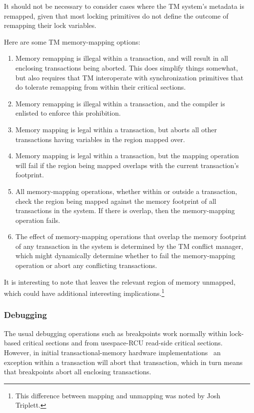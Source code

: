 It should not be necessary to consider cases where the TM system's
metadata is remapped, given that most locking primitives do not define
the outcome of remapping their lock variables.

Here are some TM memory-mapping options:

\begin{enumerate}
\item	Memory remapping is illegal within a transaction, and will result
	in all enclosing transactions being aborted.
	This does simplify things somewhat, but also requires that TM
	interoperate with synchronization primitives that do tolerate
	remapping from within their critical sections.
\item	Memory remapping is illegal within a transaction, and the
	compiler is enlisted to enforce this prohibition.
\item	Memory mapping is legal within a transaction, but aborts all
	other transactions having variables in the region mapped over.
\item	Memory mapping is legal within a transaction, but the mapping
	operation will fail if the region being mapped overlaps with
	the current transaction's footprint.
\item	All memory-mapping operations, whether within or outside a
	transaction, check the region being mapped against the memory
	footprint of all transactions in the system.
	If there is overlap, then the memory-mapping operation fails.
\item	The effect of memory-mapping operations that overlap the memory
	footprint of any transaction in the system is determined by the
	TM conflict manager, which might dynamically determine whether
	to fail the memory-mapping operation or abort any conflicting
	transactions.
\end{enumerate}

It is interesting to note that  leaves the relevant region
of memory unmapped, which could have additional interesting
implications.\footnote{
	This difference between mapping and unmapping was noted by
	Josh Triplett.}

\subsubsection{Debugging}
\label{sec:future:Debugging}

The usual debugging operations such as breakpoints work normally within
lock-based critical sections and from usespace-RCU read-side critical sections.
However, in initial transactional-memory hardware
implementations~\cite{DaveDice2009ASPLOSRockHTM} an exception within
a transaction will abort that transaction, which in turn means that
breakpoints abort all enclosing transactions.

